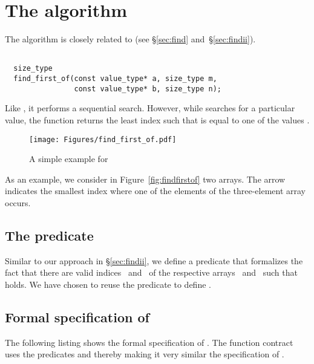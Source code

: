 
\section{The \findfirstof algorithm}

The \findfirstof algorithm \cite[\S 28.5.7]{cxx-17-draft}
is closely related to \find (see \S\ref{sec:find} and~\S\ref{sec:findii}).


\begin{lstlisting}[style=acsl-block]

  size_type
  find_first_of(const value_type* a, size_type m,
                const value_type* b, size_type n);
\end{lstlisting}

Like \find, it performs a sequential search.
However, while \find searches for a particular value, 
the function
\findfirstof returns the least index  such that  
is equal to one of the values .


\begin{figure}[hbt]
\centering
\texttt{[image: Figures/find\_first\_of.pdf]}
\caption{A simple example for \findfirstof}
\end{figure}

\FloatBarrier


As an example, we consider in Figure~\ref{fig:findfirstof} two arrays.
The arrow indicates the smallest index where one of the elements of the three-element array
occurs.

\subsection{The predicate \HasValueOf}

Similar to our approach in \S\ref{sec:findii}, we define a predicate
that formalizes the fact that there are valid indices~
and~ of the respective arrays~ and~ such that  holds.
We have chosen to reuse the predicate
 to define \HasValueOf.



\clearpage

\subsection{Formal specification of \findfirstof}

The following listing shows the formal specification of \findfirstof.
The function contract uses the predicates  and
 thereby making it
very similar the specification of .

